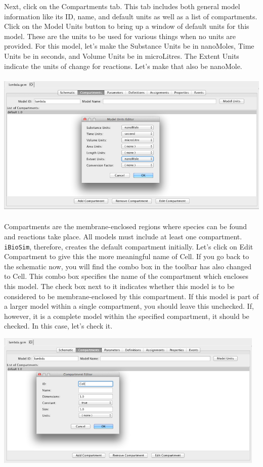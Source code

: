 \documentclass[titlepage,11pt]{article}
\begin{document}
Next, click on the Compartments tab.  This tab includes both general model information like its ID, name, and default units as well as a list of compartments.  Click on the Model Units button to bring up a window of default units for this model.  These are the units to be used for various things when no units are provided.  For this model, let's make the Substance Units be in nanoMoles, Time Units be in seconds, and Volume Units be in microLitres.  The Extent Units indicate the units of change for reactions.  Let's make that also be nanoMole.

\begin{center}
\includegraphics[height=70mm]{screenshots/ModelUnits}
\end{center}

Compartments are the membrane-enclosed regions where species can be found and reactions take place.  All models must include at least one compartment.  {\tt iBioSim}, therefore, creates the default compartment initially.  Let's click on Edit Compartment to give this the more meaningful name of Cell.  If you go back to the schematic now, you will find the combo box in the toolbar has also changed to Cell.  This combo box specifies the name of the compartment which encloses this model.  The check box next to it indicates whether this model is to be considered to be membrane-enclosed by this compartment.  If this model is part of a larger model within a single compartment, you should leave this unchecked.  If, however, it is a complete model within the specified compartment, it should be checked.  In this case, let's check it.

\begin{center}
\includegraphics[height=65mm]{screenshots/compartment}
\end{center}
\end{document}

